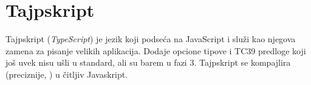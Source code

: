 \chapter{Tajpskript}

Tajpskript (\textsl{TypeScript}) je jezik koji podseća na JavaScript i služi kao njegova zamena za pisanje velikih aplikacija.
Dodaje opcione tipove i TC39 predloge koji još uvek nisu ušli u standard, ali su barem u fazi 3.
Tajpskript se kompajlira (preciznije, ) u čitljiv Javaskript.






